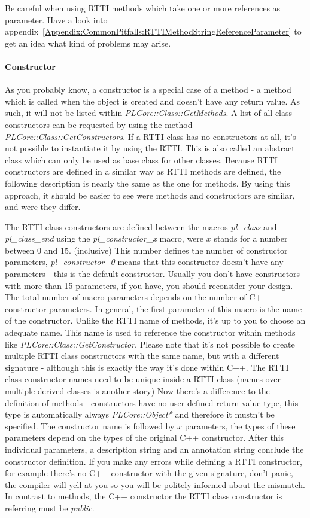 Be careful when using RTTI methods which take one or more references as parameter. Have a look into appendix~\ref{Appendix:CommonPitfalls:RTTIMethodStringReferenceParameter} to get an idea what kind of problems may arise.


\paragraph{Constructor}
\label{ClassMembers:Constructor}
As you probably know, a constructor is a special case of a method - a method which is called when the object is created and doesn't have any return value. As such, it will not be listed within \emph{PLCore::Class::GetMethods}. A list of all class constructors can be requested by using the method \emph{PLCore::Class::GetConstructors}. If a RTTI class has no constructors at all, it's not possible to instantiate it by using the RTTI. This is also called an abstract class which can only be used as base class for other classes. Because RTTI constructors are defined in a similar way as RTTI methods are defined, the following description is nearly the same as the one for methods. By using this approach, it should be easier to see were methods and constructors are similar, and were they differ.

The RTTI class constructors are defined between the macros \emph{pl\_class} and \emph{pl\_class\_end} using the \emph{pl\_constructor\_x} macro, were $x$ stands for a number between $0$ and $15$. (inclusive) This number defines the number of constructor parameters, \emph{pl\_constructor\_0} means that this constructor doesn't have any parameters - this is the default constructor. Usually you don't have constructors with more than 15 parameters, if you have, you should reconsider your design. The total number of macro parameters depends on the number of C++ constructor parameters. In general, the first parameter of this macro is the name of the constructor. Unlike the RTTI name of methods, it's up to you to choose an adequate name. This name is used to reference the constructor within methods like \emph{PLCore::Class::GetConstructor}. Please note that it's not possible to create multiple RTTI class constructors with the same name, but with a different signature - although this is exactly the way it's done within C++. The RTTI class constructor names need to be unique inside a RTTI class (names over multiple derived classes is another story) Now there's a difference to the definition of methods - constructors have no user defined return value type, this type is automatically always \emph{PLCore::Object*} and therefore it mustn't be specified. The constructor name is followed by $x$ parameters, the types of these parameters depend on the types of the original C++ constructor. After this individual parameters, a description string and an annotation string conclude the constructor definition. If you make any errors while defining a RTTI constructor, for example there's no C++ constructor with the given signature, don't panic, the compiler will yell at you so you will be politely informed about the mismatch. In contrast to methods, the C++ constructor the RTTI class constructor is referring must be \emph{public}.

